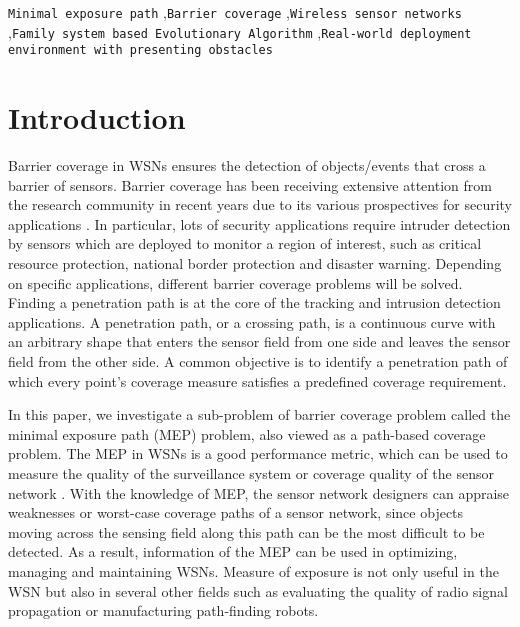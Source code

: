 \documentclass[final]{elsarticle}
\begin{document}
\begin{frontmatter}
\begin{abstract}
\end{abstract}
\begin{keyword}
\texttt{Minimal exposure path} \sep\texttt{Barrier coverage} \sep \texttt{Wireless sensor networks} \sep \texttt{Family system based Evolutionary Algorithm} \sep \texttt{Real-world deployment environment with presenting obstacles}
\end{keyword}
\end{frontmatter}
\section{Introduction}
Barrier coverage in WSNs ensures the detection of objects/events that cross a barrier of sensors. Barrier coverage has been receiving extensive attention from the research community in recent years due to its various prospectives for security applications \cite{wu2016survey,wang2011coverage,b15}. In particular, lots of security applications require intruder detection by sensors which are deployed to monitor a region of interest, such as critical resource protection, national border protection and disaster warning. Depending on specific applications, different barrier coverage problems will be solved. Finding a penetration path is at the core of the tracking and intrusion detection applications. A penetration path, or a crossing path, is a continuous curve with an arbitrary shape that enters the sensor field from one side and leaves the sensor field from the other side. A common objective is to identify  a penetration path of which every point’s coverage measure satisfies a predefined coverage requirement.

In this paper, we investigate a sub-problem of barrier coverage problem called the minimal exposure path (MEP) problem, also viewed as a path-based coverage problem. The MEP in WSNs is a good performance metric, which can be used to measure the quality of the surveillance system or coverage quality of the sensor network  \cite{b13,b17}. With the knowledge of MEP, the  sensor network designers can appraise weaknesses or worst-case coverage paths of a sensor network, since objects moving across the sensing field along this path can be  the most difficult to be detected. As a result, information of the MEP can be used in optimizing, managing and maintaining WSNs. Measure of exposure is not only useful in the WSN but also in several other fields such as evaluating the quality of radio signal propagation or  manufacturing path-finding robots.
\end{document}
